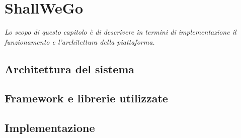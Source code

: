 \chapter{ShallWeGo}

\begin{citazione}
    \textit{Lo scopo di questo capitolo è di descrivere in termini di implementazione il funzionamento e l'architettura della piattaforma.}
\end{citazione}

\newpage

\section{Architettura del sistema}

\section{Framework e librerie utilizzate}

\section{Implementazione}